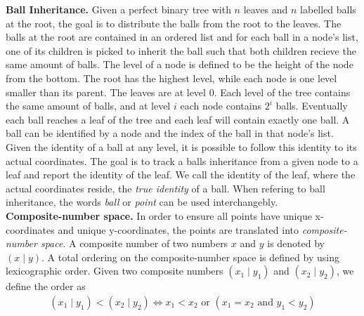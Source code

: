 
\noindent \textbf{Ball Inheritance.} Given a perfect binary tree with $n$ leaves and $n$ labelled balls at the root, the goal is to distribute the balls from the root to the leaves. The balls at the root are contained in an ordered list and for each ball in a node's list, one of its children is picked to inherit the ball such that both children recieve the same amount of balls. The level of a node is defined to be the height of the node from the bottom. The root has the highest level, while each node is one level smaller than its parent. The leaves are at level $0$. Each level of the tree contains the same amount of balls, and at level $i$ each node contains $2^i$ balls. Eventually each ball reaches a leaf of the tree and each leaf will contain exactly one ball. A ball can be identified by a node and the index of the ball in that node's list. Given the identity of a ball at any level, it is possible to follow this identity to its actual coordinates. The goal is to track a balls inheritance from a given node to a leaf and report the identity of the leaf. We call the identity of the leaf, where the actual coordinates reside, the \emph{true identity} of a ball. When refering to ball inheritance, the words \emph{ball} or \emph{point} can be used interchangebly. \\

\noindent \textbf{Composite-number space.} In order to ensure all points have unique x-coordinates and unique y-coordinates, the points are translated into \emph{composite-number space}. A composite number of two numbers $x$ and $y$ is denoted by $(x \mid y)$. A total ordering on the composite-number space is defined by using lexicographic order. Given two composite numbers $(x_1 \mid y_1)$ and $(x_2 \mid y_2)$, we define the order as
\begin{align*}
  (x_1 \mid y_1) < (x_2 \mid y_2) \iff x_1 < x_2 \text{ or } (x_1 = x_2 \text{ and } y_1 < y_2)
\end{align*}

